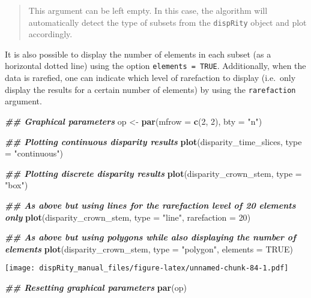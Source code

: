 \documentclass[
]{book}
\newenvironment{Shaded}{\begin{snugshade}}{\end{snugshade}}
\newcommand{\AttributeTok}[1]{\textcolor[rgb]{0.13,0.29,0.53}{#1}}
\newcommand{\ConstantTok}[1]{\textcolor[rgb]{0.56,0.35,0.01}{#1}}
\newcommand{\DecValTok}[1]{\textcolor[rgb]{0.00,0.00,0.81}{#1}}
\newcommand{\DocumentationTok}[1]{\textcolor[rgb]{0.56,0.35,0.01}{\textbf{\textit{#1}}}}
\newcommand{\FunctionTok}[1]{\textcolor[rgb]{0.13,0.29,0.53}{\textbf{#1}}}
\newcommand{\NormalTok}[1]{#1}
\newcommand{\OtherTok}[1]{\textcolor[rgb]{0.56,0.35,0.01}{#1}}
\newcommand{\StringTok}[1]{\textcolor[rgb]{0.31,0.60,0.02}{#1}}
\begin{document}
\begin{quote}
This argument can be left empty. In this case, the algorithm will automatically detect the type of subsets from the \texttt{dispRity} object and plot accordingly.
\end{quote}

It is also possible to display the number of elements in each subset (as a horizontal dotted line) using the option \texttt{elements\ =\ TRUE}.
Additionally, when the data is rarefied, one can indicate which level of rarefaction to display (i.e.~only display the results for a certain number of elements) by using the \texttt{rarefaction} argument.

\begin{Shaded}
\begin{Highlighting}[]
\DocumentationTok{\#\# Graphical parameters}
\NormalTok{op }\OtherTok{\textless{}{-}} \FunctionTok{par}\NormalTok{(}\AttributeTok{mfrow =} \FunctionTok{c}\NormalTok{(}\DecValTok{2}\NormalTok{, }\DecValTok{2}\NormalTok{), }\AttributeTok{bty =} \StringTok{"n"}\NormalTok{)}

\DocumentationTok{\#\# Plotting continuous disparity results}
\FunctionTok{plot}\NormalTok{(disparity\_time\_slices, }\AttributeTok{type =} \StringTok{"continuous"}\NormalTok{)}

\DocumentationTok{\#\# Plotting discrete disparity results}
\FunctionTok{plot}\NormalTok{(disparity\_crown\_stem, }\AttributeTok{type =} \StringTok{"box"}\NormalTok{)}

\DocumentationTok{\#\# As above but using lines for the rarefaction level of 20 elements only}
\FunctionTok{plot}\NormalTok{(disparity\_crown\_stem, }\AttributeTok{type =} \StringTok{"line"}\NormalTok{, }\AttributeTok{rarefaction =} \DecValTok{20}\NormalTok{)}

\DocumentationTok{\#\# As above but using polygons while also displaying the number of elements}
\FunctionTok{plot}\NormalTok{(disparity\_crown\_stem, }\AttributeTok{type =} \StringTok{"polygon"}\NormalTok{, }\AttributeTok{elements =} \ConstantTok{TRUE}\NormalTok{)}
\end{Highlighting}
\end{Shaded}

\texttt{[image: dispRity\_manual\_files/figure-latex/unnamed-chunk-84-1.pdf]}

\begin{Shaded}
\begin{Highlighting}[]
\DocumentationTok{\#\# Resetting graphical parameters}
\FunctionTok{par}\NormalTok{(op)}
\end{Highlighting}
\end{Shaded}
\end{document}
